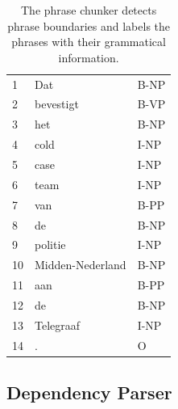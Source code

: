 \documentclass{book}
\begin{document}
\begin{table}[h]
\begin{tabular}{lll}
1&Dat&B-NP\\
2&bevestigt&B-VP\\
3&het&B-NP\\
4&cold&I-NP\\
5&case&I-NP\\
6&team&I-NP\\
7&van&B-PP\\
8&de&B-NP\\
9&politie&I-NP\\
10&Midden-Nederland&B-NP\\
11&aan&B-PP\\
12&de&B-NP\\
13&Telegraaf&I-NP\\
14&.&O\\
\end{tabular}
\caption{\label{ex-chunk} The phrase chunker detects phrase boundaries and labels the phrases with their grammatical information.}
\end{table}



\subsection{Dependency Parser}
\label{sec-dep}
\end{document}

